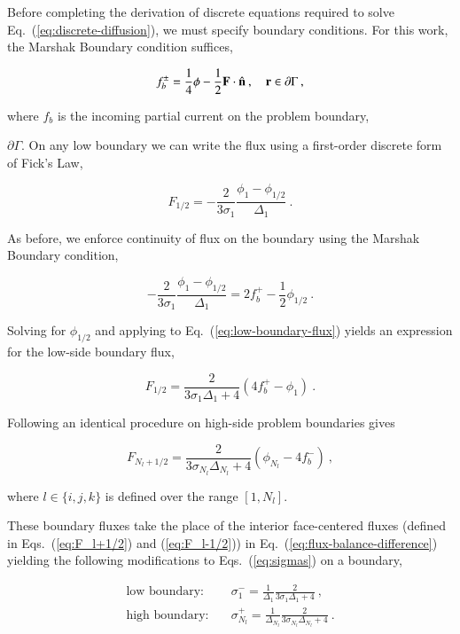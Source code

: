 \documentclass[preprint,12pt]{elsarticle}
\newcommand{\vr}{\ensuremath{\ve{r}}}
\begin{document}
Before completing the derivation of discrete equations required to
solve Eq.~(\ref{eq:discrete-diffusion}), we must specify boundary
conditions.  For this work, the Marshak Boundary condition suffices,

\begin{equation}
  f_b^\pm = \frac{1}{4}\phi -
  \frac{1}{2}\ve{F}\cdot\hat{\ve{n}}\:,\quad \vr\in \partial\Gamma\:,
\end{equation}

where $f_b$ is the incoming partial current on the problem boundary,

$\partial\Gamma$.  On any low boundary we can write the flux using a
first-order discrete form of Fick's Law,

\begin{equation}
  F_{1/2} = -\frac{2}{3\sigma_1}\frac{\phi_1 -
    \phi_{1/2}}{\Delta_1}\:.
  \label{eq:low-boundary-flux}
\end{equation}

As before, we enforce continuity of flux on the boundary using the
Marshak Boundary condition,

\begin{equation}
  -\frac{2}{3\sigma_1}\frac{\phi_1 - \phi_{1/2}}{\Delta_1} = 2f_b^{+}
  -\frac{1}{2}\phi_{1/2}\:.
\end{equation}

Solving for $\phi_{1/2}$ and applying to
Eq.~(\ref{eq:low-boundary-flux}) yields an expression for the low-side
boundary flux,

\begin{equation}
  F_{1/2} = \frac{2}{3\sigma_1\Delta_1 + 4}(4f_b^{+}-\phi_1)\:.
\end{equation}

Following an identical procedure on high-side problem boundaries gives

\begin{equation}
  F_{N_l+1/2} = \frac{2}{3\sigma_{N_l}\Delta_{N_l} +
    4}(\phi_{N_l}-4f_b^{-})\:,
\end{equation}

where $l\in\{i,j,k\}$ is defined over the range $[1,N_l]$.

These boundary fluxes take the place of the interior face-centered
fluxes (defined in Eqs.~(\ref{eq:F_l+1/2}) and (\ref{eq:F_l-1/2})) in
Eq.~(\ref{eq:flux-balance-difference}) yielding the following
modifications to Eqs.~(\ref{eq:sigmas}) on a boundary,

\begin{align}
  \text{low boundary:}\quad & \sigma_1^{-} = \frac{1}{\Delta_1}
  \frac{2}{3\sigma_1\Delta_1 + 4}\:,\\ \text{high boundary:}\quad &
  \sigma_{N_l}^{+} = \frac{1}{\Delta_{N_l}}
  \frac{2}{3\sigma_{N_l}\Delta_{N_l} + 4}\:.
\end{align}
\end{document}
